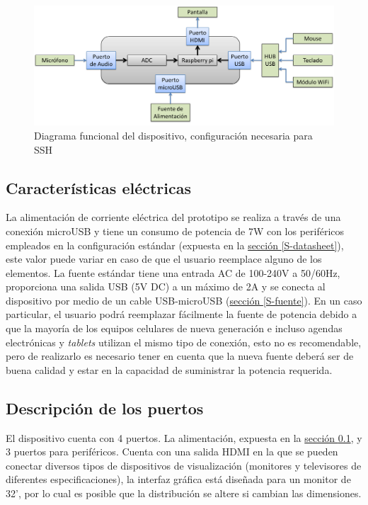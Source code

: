 \documentclass[11pt,lettersize]{article} %
\newcommand{\seccion}[1]{\hyperref[{#1}]{sección \ref*{#1}}}
\begin{document}
\begin{figure}[h!]
	\centering
	\includegraphics[width=.9\textwidth]{images/diagrama-funcional-hub.png}
	\caption{Diagrama funcional del dispositivo, configuración necesaria para SSH}
	\label{F-diagrama-func-hub}
\end{figure}

\subsection{Características eléctricas}
\label{S-carac-elec}
La alimentación de corriente eléctrica del prototipo se realiza a través de una conexión microUSB y tiene un consumo de potencia de 7W con los periféricos empleados en la configuración estándar (expuesta en la \seccion{S-datasheet}), este valor puede variar en caso de que el usuario reemplace alguno de los elementos. La fuente estándar tiene una entrada AC de 100-240V a 50/60Hz, proporciona una salida USB (5V DC) a un máximo de 2A y se conecta al dispositivo por medio de un cable USB-microUSB (\seccion{S-fuente}). En un caso particular, el usuario podrá reemplazar fácilmente la fuente de potencia debido a que la mayoría de los equipos celulares de nueva generación e incluso agendas electrónicas y \textit{tablets} utilizan el mismo tipo de conexión, esto no es recomendable, pero de realizarlo es necesario tener en cuenta que la nueva fuente deberá ser de buena calidad y estar en la capacidad de suministrar la potencia requerida.

\subsection{Descripción de los puertos}
El dispositivo cuenta con 4 puertos. La alimentación, expuesta en la \seccion{S-carac-elec}, y 3 puertos para periféricos. Cuenta con una salida HDMI en la que se pueden conectar diversos tipos de dispositivos de visualización (monitores y televisores de diferentes especificaciones), la interfaz gráfica está diseñada para un monitor de 32', por lo cual es posible que la distribución se altere si cambian las dimensiones. \\
\end{document}
